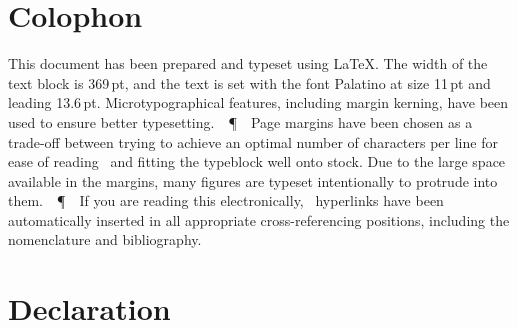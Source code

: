 \documentclass[11pt,a4paper]{memoir}
\begin{document}
\cleardoublepage

\def\PPP{\unskip~\,\textup\P~\,}

\section*{Colophon}

{\centering\begin{minipage}{0.89\textwidth}
\parfillskip=0pt
This document has been prepared and typeset using \LaTeX{}.
The width of the text block is 369\,pt, and the text is set with the font Palatino at size 11\,pt and leading 13.6\,pt.
Microtypographical features, including margin kerning, have been used to ensure better typesetting.
\PPP
Page margins have been chosen as a trade-off between trying to achieve an optimal number of characters per line for ease of reading~ and fitting the typeblock well onto  stock.
Due to the large space available in the margins, many figures are typeset intentionally to protrude into them.
\PPP
If you are reading this electronically, \PDF\ hyperlinks have been automatically inserted in all appropriate cross-referencing positions, including the nomenclature and bibliography.\par
\end{minipage}\par}

\cleardoublepage

\section*{Declaration}
\end{document}
